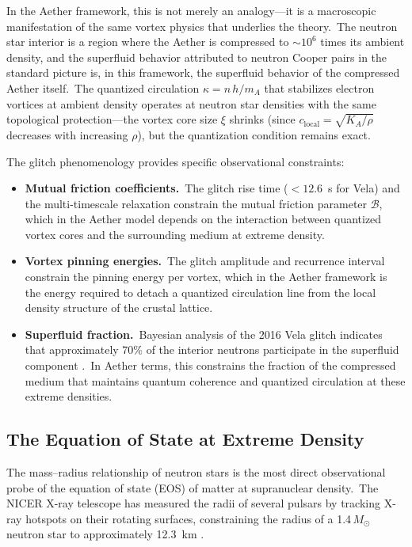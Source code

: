 ﻿\documentclass[12pt,letterpaper]{article}
\newcommand{\Ka}{K_{\!A}}
\begin{document}
In the Aether framework, this is not merely an analogy---it is a macroscopic
manifestation of the same vortex physics that underlies the theory.\ The neutron
star interior is a region where the Aether is compressed to $\sim 10^6$ times
its ambient density, and the superfluid behavior attributed to neutron Cooper
pairs in the standard picture is, in this framework, the superfluid behavior
of the compressed Aether itself.\ The quantized circulation
$\kappa = n\,h/m_A$ that stabilizes electron vortices at ambient density
operates at neutron star densities with the same topological protection---the
vortex core size $\xi$ shrinks (since $c_{\mathrm{local}} = \sqrt{\Ka/\rho}$
decreases with increasing $\rho$), but the quantization condition remains exact.

The glitch phenomenology provides specific observational constraints:

\begin{itemize}[leftmargin=2em]
  \item \textbf{Mutual friction coefficients.}\ The glitch rise time
    ($< 12.6$~s for Vela) and the multi-timescale relaxation constrain the
    mutual friction parameter $\mathcal{B}$, which in the Aether model
    depends on the interaction between quantized vortex cores and the
    surrounding medium at extreme density.

  \item \textbf{Vortex pinning energies.}\ The glitch amplitude and recurrence
    interval constrain the pinning energy per vortex, which in the Aether
    framework is the energy required to detach a quantized circulation
    line from the local density structure of the crustal lattice.

  \item \textbf{Superfluid fraction.}\ Bayesian analysis of the 2016 Vela
    glitch indicates that approximately 70\% of the interior neutrons
    participate in the superfluid component \cite{antonelli2025}.\ In Aether
    terms, this constrains the fraction of the compressed medium that
    maintains quantum coherence and quantized circulation at these extreme
    densities.
\end{itemize}


\subsection{The Equation of State at Extreme Density}

The mass--radius relationship of neutron stars is the most direct observational
probe of the equation of state (EOS) of matter at supranuclear density.\ The
NICER X-ray telescope has measured the radii of several pulsars by tracking
X-ray hotspots on their rotating surfaces, constraining the radius of a
1.4\,$M_\odot$ neutron star to approximately 12.3~km \cite{miller2021,riley2021}.
\end{document}
